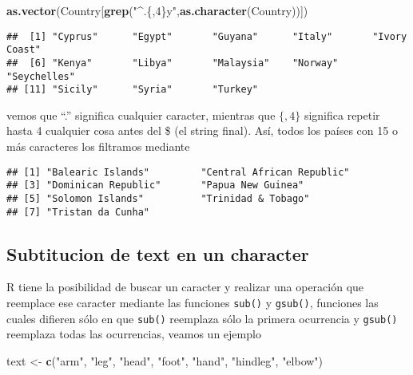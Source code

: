 \documentclass[]{article}
\newenvironment{Shaded}{\begin{snugshade}}{\end{snugshade}}
\newcommand{\KeywordTok}[1]{\textcolor[rgb]{0.13,0.29,0.53}{\textbf{#1}}}
\newcommand{\StringTok}[1]{\textcolor[rgb]{0.31,0.60,0.02}{#1}}
\newcommand{\NormalTok}[1]{#1}
\begin{document}
\begin{Shaded}
\begin{Highlighting}[]
\KeywordTok{as.vector}\NormalTok{(Country[}\KeywordTok{grep}\NormalTok{(}\StringTok{"^.\{,4\}y"}\NormalTok{,}\KeywordTok{as.character}\NormalTok{(Country))])}
\end{Highlighting}
\end{Shaded}

\begin{verbatim}
##  [1] "Cyprus"      "Egypt"       "Guyana"      "Italy"       "Ivory Coast"
##  [6] "Kenya"       "Libya"       "Malaysia"    "Norway"      "Seychelles" 
## [11] "Sicily"      "Syria"       "Turkey"
\end{verbatim}

vemos que ``.'' significa cualquier caracter, mientras que \(\{,4\}\)
significa repetir hasta 4 cualquier cosa antes del \$ (el string final).
Así, todos los países con 15 o más caracteres los filtramos mediante

\begin{Shaded}
\end{Shaded}

\begin{verbatim}
## [1] "Balearic Islands"         "Central African Republic"
## [3] "Dominican Republic"       "Papua New Guinea"        
## [5] "Solomon Islands"          "Trinidad & Tobago"       
## [7] "Tristan da Cunha"
\end{verbatim}

\subsection{Subtitucion de text en un
character}\label{subtitucion-de-text-en-un-character}

R tiene la posibilidad de buscar un caracter y realizar una operación
que reemplace ese caracter mediante las funciones \texttt{sub()} y
\texttt{gsub()}, funciones las cuales difieren sólo en que
\texttt{sub()} reemplaza sólo la primera ocurrencia y \texttt{gsub()}
reemplaza todas las ocurrencias, veamos un ejemplo

\begin{Shaded}
\begin{Highlighting}[]
\NormalTok{text <-}\StringTok{ }\KeywordTok{c}\NormalTok{(}\StringTok{"arm"}\NormalTok{, }\StringTok{"leg"}\NormalTok{, }\StringTok{"head"}\NormalTok{, }\StringTok{"foot"}\NormalTok{, }\StringTok{"hand"}\NormalTok{, }\StringTok{"hindleg"}\NormalTok{, }\StringTok{"elbow"}\NormalTok{)}
\end{Highlighting}
\end{Shaded}
\end{document}
